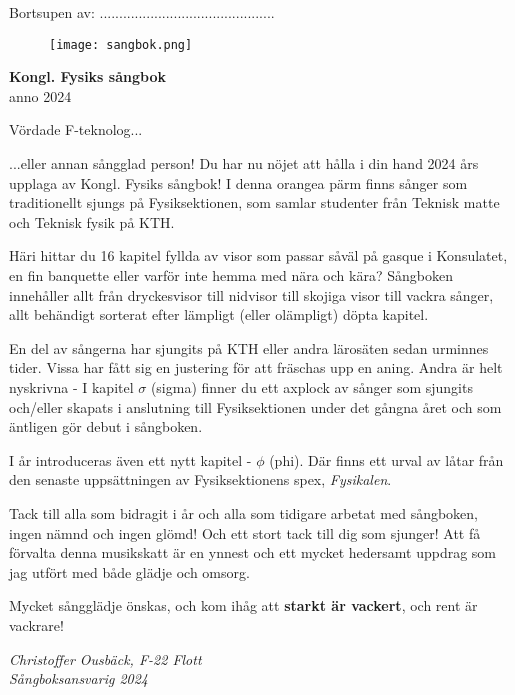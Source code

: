 \documentclass[a6paper,12pt]{article}
\begin{document}
\noindent Bortsupen av: .............................................
\vspace{50pt}
\begin{figure}[!h]
\centering
\texttt{[image: sangbok.png]}
\end{figure}
\vspace{-20pt}
\begin{center}
\Huge\textbf{Kongl. Fysiks sångbok} \\
\Large anno 2024
\end{center}

\newpage
\setlength{\oddsidemargin}{-0.57in}
\noindent
\Large Vördade F-teknolog... 

\footnotesize \noindent ...eller annan sångglad person!  
Du har nu nöjet att hålla i din hand 2024 års upplaga av Kongl. Fysiks sångbok!
I denna orangea pärm finns sånger som traditionellt sjungs på Fysiksektionen, 
som samlar studenter från Teknisk matte och Teknisk fysik på KTH.

Häri hittar du 16 kapitel fyllda av visor som passar såväl på gasque i Konsulatet, 
en fin banquette eller varför inte hemma med nära och kära? 
Sångboken innehåller allt från dryckesvisor till nidvisor
till skojiga visor till vackra sånger, allt behändigt
sorterat efter lämpligt (eller olämpligt) döpta kapitel.

En del av sångerna har sjungits på KTH eller andra lärosäten sedan urminnes tider.
Vissa har fått sig en justering för att fräschas upp en aning.
Andra är helt nyskrivna - I kapitel $\sigma$ (sigma) finner du ett axplock av sånger som sjungits
och/eller skapats i anslutning till Fysiksektionen under det gångna året 
och som äntligen gör debut i sångboken. 

I år introduceras även ett nytt kapitel - $\phi$ (phi). 
Där finns ett urval av låtar från den senaste uppsättningen av Fysiksektionens spex, \textit{Fysikalen}.

Tack till alla som bidragit i år och alla som tidigare arbetat med sångboken, ingen nämnd och ingen glömd! 
Och ett stort tack till dig som sjunger! Att få förvalta denna musikskatt är en
ynnest och ett mycket hedersamt uppdrag som jag utfört med både glädje och omsorg.

Mycket sångglädje önskas, och kom ihåg att \textbf{starkt
är vackert}, och rent är vackrare!

\begin{flushright}
\textit{Christoffer Ousbäck, F-22 Flott\\ Sångboksansvarig 2024}
\end{flushright}
\end{document}

